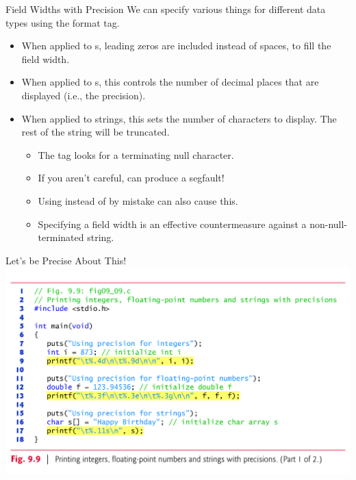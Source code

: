 \documentclass[11pt]{beamer}
\let\OldTexttt\texttt
\renewcommand{\texttt}[1]{\OldTexttt{\color{teal}{#1}}}
\begin{document}
\begin{frame}{Field Widths with Precision}
We can specify various things for different data types using the \texttt{.X} format tag.
\begin{itemize}
\item When applied to \texttt{int}s, leading zeros are included instead of spaces, to fill the field width.
\item When applied to \texttt{float}s, this controls the number of decimal places that are displayed (i.e., the precision).
\item When applied to strings, this sets the number of characters to display.  The rest of the string will be truncated.
\begin{itemize}
\item The \texttt{\%s} tag looks for a terminating null character.
\item If you aren't careful, \texttt{\% s} can produce a segfault! 
\item Using \texttt{\% s} instead of \texttt{\% c} by mistake can also cause this.
\item Specifying a field width is an effective countermeasure against a non-null-terminated string.  
\end{itemize}
\end{itemize}
\end{frame}

\begin{frame}{Let's be Precise About This!}
\center
\includegraphics[scale=0.12]{prec.png}
\end{frame}
\end{document}
